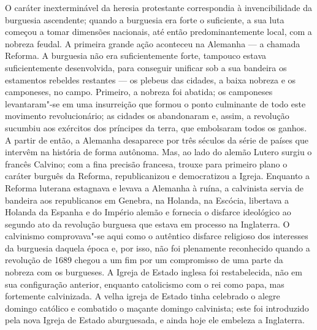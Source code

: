 O caráter inexterminável da heresia protestante correspondia à
invencibilidade da burguesia ascendente; quando a burguesia era forte o
suficiente, a sua luta começou a tomar dimensões nacionais, até então
predominantemente local, com a nobreza feudal. A primeira grande ação
aconteceu na Alemanha --- a chamada Reforma. A burguesia não era
suficientemente forte, tampouco estava suficientemente desenvolvida,
para conseguir unificar sob a sua bandeira os estamentos rebeldes
restantes --- os plebeus das cidades, a baixa nobreza e os camponeses, no
campo. Primeiro, a nobreza foi abatida; os camponeses levantaram"-se em
uma insurreição que formou o ponto culminante de todo este movimento
revolucionário; as cidades os abandonaram e, assim, a revolução sucumbiu
aos exércitos dos príncipes da terra, que embolsaram todos os ganhos. A
partir de então, a Alemanha desaparece por três séculos da série de
países que intervêm na história de forma autônoma. Mas, ao lado do
alemão Lutero surgiu o
francês Calvino;
com a fina precisão francesa, trouxe para primeiro plano o caráter
burguês da Reforma, republicanizou e democratizou a Igreja. Enquanto a
Reforma luterana estagnava e levava a Alemanha à ruína, a calvinista
servia de bandeira aos republicanos em Genebra, na Holanda, na Escócia,
libertava a Holanda da Espanha e do Império alemão e fornecia o
disfarce ideológico ao segundo ato da revolução burguesa que estava em
processo na Inglaterra. O calvinismo comprovava"-se aqui como o autêntico
disfarce religioso dos interesses da burguesia daquela época e, por
isso, não foi plenamente reconhecido quando a revolução de 1689 chegou a
um fim por um compromisso de uma parte da nobreza com os burgueses. A Igreja de Estado
inglesa foi restabelecida, não em sua configuração anterior, enquanto
catolicismo com o rei como papa, mas fortemente calvinizada. A velha
igreja de Estado tinha celebrado o alegre domingo católico e combatido o
maçante domingo calvinista; este foi introduzido pela nova Igreja de
Estado aburguesada, e ainda hoje ele embeleza a Inglaterra.

